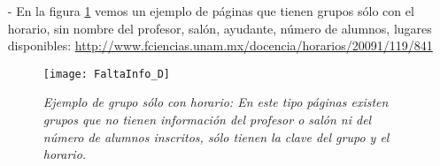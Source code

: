 \begin{itemize}
\item[-] En la figura \ref{SoloHorario} vemos un ejemplo de páginas que tienen grupos sólo con el horario, sin nombre del profesor, salón, ayudante, número de alumnos, lugares disponibles: \url{http://www.fciencias.unam.mx/docencia/horarios/20091/119/841} %

\begin{figure}[H]
\centering
\texttt{[image: FaltaInfo\_D]} %
\caption[\textit{Ejemplo de grupo sólo con horario}]{\textit{Ejemplo de grupo sólo con horario: En este tipo páginas existen grupos que no tienen información del profesor o salón ni del número de alumnos inscritos, sólo tienen la clave del grupo y el horario.}}\label{SoloHorario}
\end{figure}
\end{itemize}